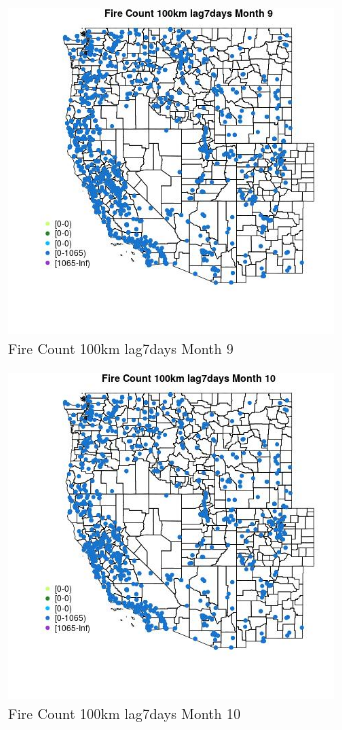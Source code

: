 \begin{figure} 
\centering  
\includegraphics[width=0.77\textwidth]{Code_Outputs/Report_ML_input_PM25_Step4_part_f_de_duplicated_aves_prioritize_24hr_obswNAs_MapObsMo9Fire_Count_100km_lag7days.jpg} 
\caption{\label{fig:Report_ML_input_PM25_Step4_part_f_de_duplicated_aves_prioritize_24hr_obswNAsMapObsMo9Fire_Count_100km_lag7days}Fire Count 100km lag7days Month 9} 
\end{figure} 
 

\begin{figure} 
\centering  
\includegraphics[width=0.77\textwidth]{Code_Outputs/Report_ML_input_PM25_Step4_part_f_de_duplicated_aves_prioritize_24hr_obswNAs_MapObsMo10Fire_Count_100km_lag7days.jpg} 
\caption{\label{fig:Report_ML_input_PM25_Step4_part_f_de_duplicated_aves_prioritize_24hr_obswNAsMapObsMo10Fire_Count_100km_lag7days}Fire Count 100km lag7days Month 10} 
\end{figure} 
 

